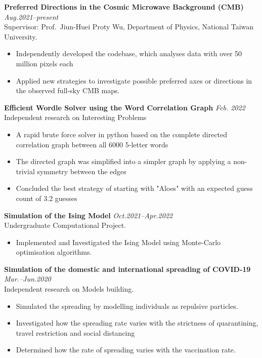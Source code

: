 \documentclass[11pt,a4paper,roman]{moderncv}        %
\begin{document}
\textbf{Preferred Directions in the Cosmic Microwave Background (CMB)} \hfill \textit{Aug.2021--present}
\vspace*{1mm}\\
{Supervisor: Prof.\ Jiun-Huei Proty Wu, Department of Physics, National Taiwan University.}
\vspace*{1mm}
\begin{itemize}
	\item Independently developed the codebase, which analyses data with over 50 million pixels each
	\item Applied new strategies to investigate possible preferred axes or directions in the observed full-sky CMB maps.
\end{itemize}

\textbf{Efficient Wordle Solver using the Word Correlation Graph} \hfill \textit{Feb. 2022}
\vspace*{1mm}\\
{Independent research on Interesting Problems}
\vspace*{1mm}
\begin{itemize}
	\item A rapid brute force solver in python based on the complete directed correlation graph between all 6000 5-letter words
	\item The directed graph was simplified into a simpler graph by applying a non-trivial symmetry between the edges
	\item Concluded the best strategy of starting with "Aloes" with an expected guess count of 3.2 guesses
\end{itemize}

\textbf{Simulation of the Ising Model} \hfill \textit{Oct.2021--Apr.2022}
\vspace*{1mm}\\
{Undergraduate Computational Project.}
\vspace*{1mm}
\begin{itemize}
	\item Implemented and Investigated the Ising Model using Monte-Carlo optimisation algorithms.
\end{itemize}

\textbf{Simulation of the domestic and international spreading of COVID-19} \hfill \textit{Mar.--Jun.2020}
\vspace*{1mm}\\
{Independent research on Models building.}
\vspace*{1mm}
\begin{itemize}
	\item Simulated the spreading by modelling individuals as repulsive particles.
	\item Investigated how the spreading rate varies with the strictness of quarantining, travel restriction and  social distancing
	\item Determined how the rate of spreading varies with the vaccination rate.
\end{itemize}
\end{document}
